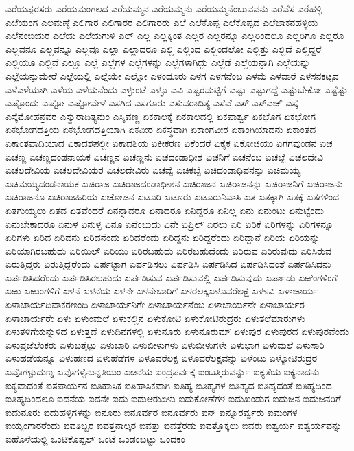 {ಎರೆಯಪ್ಪರಸರು
ಎರೆಯಮಂಗಲದ
ಎರೆಯಮ್ಮನ
ಎರೆಯಮ್ಮನು
ಎರೆಯಮ್ಮನೆಂಬುವವನು
ಎರೆವೆಸ
ಎರೆಹಳ್ಳಿ
ಎಱೆಯಂಗ
ಎಲಮಣ್ಠೆ
ಎಲಿಗಾರ
ಎಲಿಗಾರರ
ಎಲಿಗಾರರು
ಎಲೆ
ಎಲೆಕೊಪ್ಪ
ಎಲೆಕೊಪ್ಪದ
ಎಲೆಚಾಕನಹಳ್ಳಿಯ
ಎಲೆನಂಬಿಯರ
ಎಲೆಯ
ಎಲೆಯಗುಳಿ
ಎಲ್
ಎಲ್ಲ
ಎಲ್ಲಕ್ಕಿಂತ
ಎಲ್ಲರ
ಎಲ್ಲರನ್ನೂ
ಎಲ್ಲರಿಂದಲೂ
ಎಲ್ಲರಿಗೂ
ಎಲ್ಲರೂ
ಎಲ್ಲವನೂ
ಎಲ್ಲವನ್ನೂ
ಎಲ್ಲವೂ
ಎಲ್ಲಾ
ಎಲ್ಲಾದರೂ
ಎಲ್ಲಿ
ಎಲ್ಲಿಂದ
ಎಲ್ಲಿಂದಲೋ
ಎಲ್ಲಿತ್ತು
ಎಲ್ಲಿದೆ
ಎಲ್ಲಿದ್ದರೆ
ಎಲ್ಲಿಯೂ
ಎಲ್ಲಿವೆ
ಎಲ್ಲೂ
ಎಲ್ಲೆ
ಎಲ್ಲೆಗಳ
ಎಲ್ಲೆಗಳನ್ನು
ಎಲ್ಲೆಗಳಾಗಿದ್ದು
ಎಲ್ಲೆಡೆ
ಎಲ್ಲೆಯನ್ನಾಗಿ
ಎಲ್ಲೆಯನ್ನು
ಎಲ್ಲೆಯನ್ನುಮೇರೆ
ಎಲ್ಲೆಯಲ್ಲಿ
ಎಲ್ಲೆಯೇ
ಎಲ್ಲೋ
ಎಳಂದೂರು
ಎಳಗ
ಎಳಗನೆಂಬ
ಎಳಮೆ
ಎಳವಾರೆ
ಎಳಸನಕಟ್ಟವ
ಎಳೆಎಳೆಯಾಗಿ
ಎಳೆಯ
ಎಳೆಯನೆಂದು
ಎಳ್ಳುಂಟೆ
ಎಳ್ಳೂ
ಎವಿ
ಎಷ್ಟರಮಟ್ಟಿಗೆ
ಎಷ್ಟು
ಎಷ್ಟುಗದ್ದೆ
ಎಷ್ಟುಬೇಕೋ
ಎಷ್ಟೆಷ್ಟು
ಎಷ್ಟೊಂದು
ಎಷ್ಟೋ
ಎಷ್ಟೋವೇಳೆ
ಎಸಗಿದ
ಎಸಗೂರು
ಎಸುವರಾದಿತ್ಯ
ಎಸೆವೆ
ಎಸ್
ಎಸ್ಎಚ್
ಎಸ್ಕೆ
ಎಸ್ಕೆಮೋಹನ್ರವರ
ಎಸ್ವುರಾದಿತ್ಯನುಂ
ಎಸ್ಶಿವಣ್ಣ
ಏಕಕಾಲಕ್ಕೆ
ಏಕಕಾಲದಲ್ಲಿ
ಏಕಪಾರ್ಶ್ವ
ಏಕಭೊಗ
ಏಕಭೋಗ
ಏಕಭೋಗದತ್ತಿಯ
ಏಕಭೋಗದತ್ತಿಯಾಗಿ
ಏಕವೀರ
ಏಕಸ್ಥವಾಗಿ
ಏಕಾಂಗವೀರ
ಏಕಾಂಗಿಯಾದನು
ಏಕಾಂತದ
ಏಕಾಂತವಾದಿಯಾದ
ಏಕಾದಶಪಲ್ಲೀ
ಏಕಾದಶಿಯ
ಏಕೀಕರಣ
ಏಕೆಂದರೆ
ಏಕೈಕ
ಏಕೋಜಿಯು
ಏಗಗವುಂಡನ
ಏಚ
ಏಚಣ್ಣ
ಏಚಣ್ಣದಂಡನಾಯಕ
ಏಚಣ್ಣನ
ಏಚಣ್ಣನು
ಏಚದಂಡಾಧೀಶ
ಏಚನಿಗೆ
ಏಚನೆಂಬ
ಏಚಬ್ಬೆ
ಏಚಲದೇವಿ
ಏಚಲದೇವಿಯ
ಏಚಲದೇವಿಯರ
ಏಚಲದೇವಿರು
ಏಚವ್ವೆ
ಏಚಿಕಬ್ಬೆ
ಏಚಿದಂಡಾಧಿಪನನ್ನು
ಏಚಿಮಯ್ಯ
ಏಚಿಮಯ್ಯದಂಡನಾಯಕ
ಏಚಿರಾಜ
ಏಚಿರಾಜದಂಡಾಧೀಶನ
ಏಚಿರಾಜನ
ಏಚಿರಾಜನನ್ನು
ಏಚಿರಾಜನಿಗೆ
ಏಚಿರಾಜನು
ಏಚಿರಾಜನೂ
ಏಚಿರಾಜಹಿರಿಯ
ಏಚೋಜನ
ಏಟೂರಿ
ಏಟೂರು
ಏಟೂರುನಿವಾಸಿ
ಏತ
ಏತಕ್ಕಾಗಿ
ಏತಕ್ಕೆ
ಏತಗಳಿಂದ
ಏತಗುಯ್ಯಲು
ಏತದ
ಏತವೆಂದರೆ
ಏನನ್ನಾದರೂ
ಏನಾದರೂ
ಏನಿದ್ದರೂ
ಏನಿಲ್ಲ
ಏನು
ಏನುಂಟು
ಏನುಟ್ಟೆಂದು
ಏನುಬೇಕಾದರೂ
ಏನುಳ
ಏನುಳ್ಳ
ಏನೂ
ಏನೆಂಬುದು
ಏನೇ
ಏಪ್ರಿಲ್
ಏರಲು
ಏರಿ
ಏರಿಕೆ
ಏರಿಗಳನ್ನು
ಏರಿಗಳನ್ನೂ
ಏರಿಗಳು
ಏರಿದ
ಏರಿದನು
ಏರಿದನೆಂದು
ಏರಿದರೆಂದು
ಏರಿದ್ದನು
ಏರಿದ್ದರೆಂದು
ಏರಿದ್ದಾನೆ
ಏರಿಯ
ಏರಿಯನ್ನು
ಏರಿಯಾಗಿರಬಹುದು
ಏರಿಯಿಲ್
ಏರಿಯು
ಏರಿರಬಹುದು
ಏರಿರಬಹುದೆಂದು
ಏರಿರುವ
ಏರಿರುವುದು
ಏರಿಸಿರುವ
ಏರುತ್ತಿದ್ದರು
ಏರುತ್ತಿದ್ದರೆಂದು
ಏರ್ಪಟ್ಟಾಗ
ಏರ್ಪಡಿಸಲು
ಏರ್ಪಡಿಸಿ
ಏರ್ಪಡಿಸಿದ
ಏರ್ಪಡಿಸಿದಂತೆ
ಏರ್ಪಡಿಸಿದನು
ಏರ್ಪಡಿಸಿದರೆಂದು
ಏರ್ಪಡಿಸಿರಬಹುದು
ಏರ್ಪಡಿಸುವ
ಏರ್ಪಡಿಸುವಲ್ಲಿ
ಏರ್ಪಡಿಸುವುದು
ಏರ್ಪಾಡು
ಏಱಿಂಗಳಿಂಗೆ
ಏಱು
ಏಱುಂಗಳಿಗೆ
ಏಳನೆ
ಏಳನೆಯ
ಏಳನೇ
ಏಳನೇಬಾರಿಗೆ
ಏಳರಲಕ್ಕಏಳೂವರೆಲಕ್ಷ
ಏಳಳವಿ
ಏಳಾಚಾರ್ಯ
ಏಳಾಚಾರ್ಯದಿವಾಕರಣಂದಿ
ಏಳಾಚಾರ್ಯನಿಗೇ
ಏಳಾಚಾರ್ಯನೆಂಬ
ಏಳಾಚಾರ್ಯನೇ
ಏಳಾಚಾರ್ಯರ
ಏಳಾಚಾರ್ಯರೇ
ಏಳು
ಏಳುಂಮಲೆ
ಏಳುಕಲ್ಲಿನ
ಏಳುಕೋಟಿ
ಏಳುಕೋಟಿರುದ್ರರು
ಏಳುತಲೆಮಾರುಗಳು
ಏಳುತಳಿಗೆಯನ್ನುಳಿದ
ಏಳುತ್ತದೆ
ಏಳುದಿನಗಳಲ್ಲಿ
ಏಳುನೂರು
ಏಳುನೂರುಮ್
ಏಳುಪುರ
ಏಳುಪುರದ
ಏಳುಪುರವೆಂದು
ಏಳುಪ್ರಜೆಲೆಂಕರು
ಏಳುಬತ್ತೆಟ್ಟು
ಏಳುಬಾರಿ
ಏಳುಬೀಳುಗಳು
ಏಳುಬೀಳುಗಳೇ
ಏಳುಭಾಗ
ಏಳುಮಲೆ
ಏಳುಸಾರಿ
ಏಳುಹಡೆಯನ್ನೂ
ಏಳುಹಣದ
ಏಳುಹೆಡೆಗಳ
ಏಳೂವರೆಲಕ್ಷ
ಏಳೂವರೆಲಕ್ಷವನ್ನು
ಏಳೆಂಟು
ಏಳ್ಕೋಟಿರುದ್ರರ
ಏವೊಗಳ್ಪುದುಣ್ನ
ಏವೊಗಳ್ವೆನುನ್ನತಿಯಂ
ಏೞನೆಯ
ಐಂದ್ರಪರ್ವಕ್ಕೆ
ಐಂಬತ್ತಿರುವರ್ನ್ನು
ಐಕ್ಯತೆಯ
ಐಕ್ಯನಾದನು
ಐಕ್ಯವಾದಂತೆ
ಐತಪಾರ್ಯನ
ಐತಿಹಾಸಿಕ
ಐತಿಹಾಸಿಕವಾಗಿ
ಐತಿಹ್ಯ
ಐತಿಹ್ಯಗಳ
ಐತಿಹ್ಯದ
ಐತಿಹ್ಯದಂತೆ
ಐತಿಹ್ಯದಿಂದ
ಐತಿಹ್ಯದಿಂದಲೂ
ಐದನೆಯ
ಐದನೇ
ಐದು
ಐದುಆರುಏಳು
ಐದುಕೋಣೆಗಳ
ಐದುಖಂಡುಗ
ಐದುಜನ
ಐದುಜನರಿಗೆ
ಐದುನೂರು
ಐದುಹಳ್ಳಿಗಳನ್ನು
ಐನೂರು
ಐನೂರ್ವರ
ಐನೂರ್ವರು
ಐನ್
ಐನ್ನೂರರ್ವ್ವರು
ಐಮಂಗಳ
ಐಯ್ಯಂಗಾರರೆಂದು
ಐವತಿಬ್ಬರ
ಐವತ್ತನಾಲ್ಕರ
ಐವತ್ತು
ಐವತ್ತೆರಡು
ಐವತ್ತೊಕ್ಕಲು
ಐವರು
ಐಶ್ವರ್ಯ
ಐಶ್ವರ್ಯವನ್ನು
ಐಹೊಳೆಯಲ್ಲಿ
ಒಂಟಿಕೊಪ್ಪಲ್
ಒಂಟೆ
ಒಂಡಂಬಟ್ಟು
ಒಂದಕಂ
}
